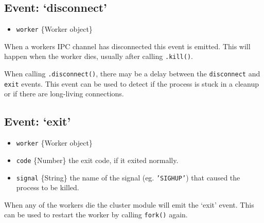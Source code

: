 \subsection{Event: `disconnect'}

\begin{itemize}
\item
  \texttt{worker} \{Worker object\}
\end{itemize}

When a workers IPC channel has disconnected this event is emitted. This
will happen when the worker dies, usually after calling
\texttt{.kill()}.

When calling \texttt{.disconnect()}, there may be a delay between the
\texttt{disconnect} and \texttt{exit} events. This event can be used to
detect if the process is stuck in a cleanup or if there are long-living
connections.

\begin{Shaded}
\begin{Highlighting}[]
\NormalTok{(}\NormalTok{, }
  \NormalTok{(} \NormalTok{+ } \NormalTok{+ }\NormalTok{);}
\NormalTok{\});}
\end{Highlighting}
\end{Shaded}

\subsection{Event: `exit'}

\begin{itemize}
\item
  \texttt{worker} \{Worker object\}
\item
  \texttt{code} \{Number\} the exit code, if it exited normally.
\item
  \texttt{signal} \{String\} the name of the signal (eg.
  \texttt{'SIGHUP'}) that caused the process to be killed.
\end{itemize}

When any of the workers die the cluster module will emit the `exit'
event. This can be used to restart the worker by calling \texttt{fork()}
again.

\begin{Shaded}
\begin{Highlighting}[]
\NormalTok{(}\NormalTok{, }
   \NormalTok{;}
  \NormalTok{(} \NormalTok{+ } \NormalTok{+ }\NormalTok{);}
  \NormalTok{();}
\NormalTok{\});}
\end{Highlighting}
\end{Shaded}

